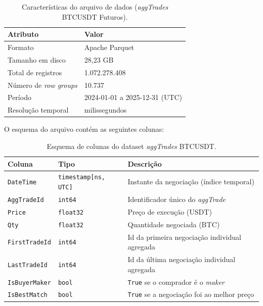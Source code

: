 \begin{table}[ht]
    \centering
    \caption{Características do arquivo de dados (\textit{aggTrades} BTCUSDT Futuros).}
    \label{tab:arquivo_parquet}
    \begin{tabular}{ll}
        \toprule
        \textbf{Atributo}        & \textbf{Valor}                              \\
        \midrule
        Formato                  & Apache Parquet                              \\
        Tamanho em disco         & 28{,}23 GB                                  \\
        Total de registros       & 1.072.278.408                               \\
        Número de \textit{row groups} & 10.737                                 \\
        Período                  & 2024-01-01 a 2025-12-31 (UTC)               \\
        Resolução temporal       & milissegundos                               \\
        \bottomrule
    \end{tabular}
\end{table}

O esquema do arquivo contém as seguintes colunas:

\begin{table}[ht]
    \centering
    \caption{Esquema de colunas do dataset \textit{aggTrades} BTCUSDT.}
    \label{tab:schema}
    \begin{tabular}{lll}
        \toprule
        \textbf{Coluna}    & \textbf{Tipo}               & \textbf{Descrição}                                     \\
        \midrule
        \texttt{DateTime}      & \texttt{timestamp[ns, UTC]} & Instante da negociação (índice temporal)               \\
        \texttt{AggTradeId}    & \texttt{int64}              & Identificador único do \textit{aggTrade}               \\
        \texttt{Price}         & \texttt{float32}            & Preço de execução (USDT)                               \\
        \texttt{Qty}           & \texttt{float32}            & Quantidade negociada (BTC)                             \\
        \texttt{FirstTradeId}  & \texttt{int64}              & Id da primeira negociação individual agregada          \\
        \texttt{LastTradeId}   & \texttt{int64}              & Id da última negociação individual agregada            \\
        \texttt{IsBuyerMaker}  & \texttt{bool}               & \texttt{True} se o comprador é o \textit{maker}        \\
        \texttt{IsBestMatch}   & \texttt{bool}               & \texttt{True} se a negociação foi ao melhor preço      \\
        \bottomrule
    \end{tabular}
\end{table}

